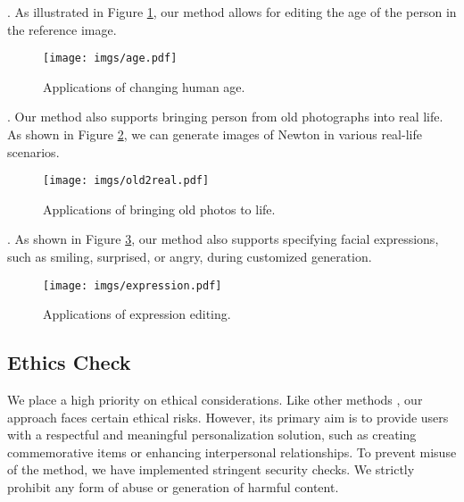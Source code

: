 .
As illustrated in Figure \ref{fig:age}, our method allows for editing the age of the person in the reference image. 


\begin{figure}[t]
    \centering
    \texttt{[image: imgs/age.pdf]} %
    \caption{Applications of changing human age.} %
    \label{fig:age} %
\end{figure}

.
Our method also supports bringing person from old photographs into real life. As shown in Figure \ref{fig:old2real}, we can generate images of Newton in various real-life scenarios.


\begin{figure}[t]
    \centering
    \texttt{[image: imgs/old2real.pdf]} %
    \caption{Applications of bringing old photos to life.} %
    \label{fig:old2real} %
\end{figure}








.
As shown in Figure \ref{fig:expression}, our method also supports specifying facial expressions, such as smiling, surprised, or angry, during customized generation.

\begin{figure}[H]
    \centering
    \texttt{[image: imgs/expression.pdf]} %
    \caption{Applications of expression editing.} %
    \label{fig:expression} %
\end{figure}





\subsection{Ethics Check}
We place a high priority on ethical considerations. Like other methods \cite{ruiz2023dreambooth, li2024photomaker, wang2024instantid}, our approach faces certain ethical risks. However, its primary aim is to provide users with a respectful and meaningful personalization solution, such as creating commemorative items or enhancing interpersonal relationships. To prevent misuse of the method, we have implemented stringent security checks. We strictly prohibit any form of abuse or generation of harmful content.
